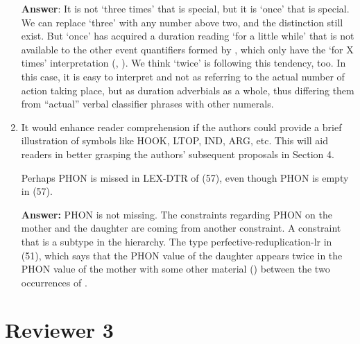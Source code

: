 \documentclass[fleqn,twoside]{article}
\begin{document}
\begin{enumerate}
\noindent
\textbf{Answer}:
It is not   `three times' that is special, but it is   `once' that is special.
We can replace  `three' with any number above two,
and the distinction still exist.
But   `once' has acquired a duration reading `for a little while' that is not available to the other event quantifiers formed by , which only have the `for X times' interpretation (\citealt[77]{Deng2013}, \citealt[16]{Zhang2000}).
We think   `twice' is following this tendency, too.
In this case, it is easy to interpret   and   not as referring to the actual number of action taking place,
but as duration adverbials as a whole,
thus differing them from ``actual'' verbal classifier phrases with other numerals.

\item
It would enhance reader comprehension if the authors could provide a brief illustration of symbols
like HOOK, LTOP, IND, ARG, etc. This will aid readers in better grasping the authors' subsequent
proposals in Section 4.


Perhaps PHON is missed in LEX-DTR of (57), even though PHON is empty in (57).

\noindent
\textbf{Answer:} PHON is not missing. The constraints regarding PHON on the mother and the daughter are coming from
another constraint. A constraint that is a subtype in the hierarchy. The type
perfective-reduplication-lr in (51), which says that the PHON value of the daughter  appears
twice in the PHON value of the mother with some other material (\etag) between the two occurrences of .

\end{enumerate}

\section{Reviewer 3}
\end{document}

